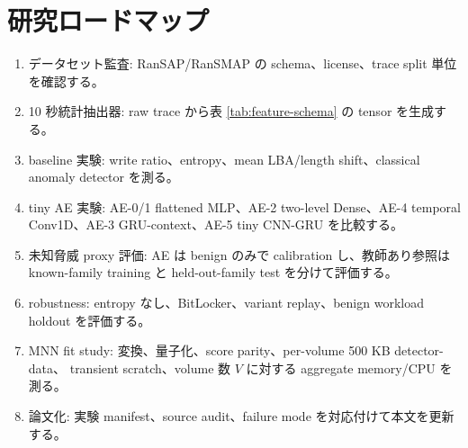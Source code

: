 \section{研究ロードマップ}

\begin{enumerate}
  \item データセット監査: RanSAP/RanSMAP の schema、license、trace split 単位を確認する。
  \item 10 秒統計抽出器: raw trace から表 \ref{tab:feature-schema} の tensor を生成する。
  \item baseline 実験: write ratio、entropy、mean LBA/length shift、classical anomaly detector を測る。
  \item tiny AE 実験: AE-0/1 flattened MLP、AE-2 two-level Dense、AE-4 temporal Conv1D、AE-3 GRU-context、AE-5 tiny CNN-GRU を比較する。
  \item 未知脅威 proxy 評価: AE は benign のみで calibration し、教師あり参照は
        known-family training と held-out-family test を分けて評価する。
  \item robustness: entropy なし、BitLocker、variant replay、benign workload holdout を評価する。
  \item MNN fit study: 変換、量子化、score parity、per-volume 500 KB detector-data、
        transient scratch、volume 数 $V$ に対する aggregate memory/CPU を測る。
  \item 論文化: 実験 manifest、source audit、failure mode を対応付けて本文を更新する。
\end{enumerate}
